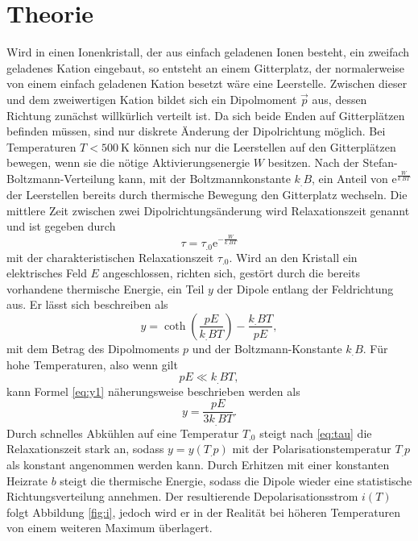 \section{Theorie}
\label{sec:Theorie}

Wird in einen Ionenkristall, der aus einfach geladenen Ionen besteht, ein zweifach geladenes Kation eingebaut, so entsteht an einem Gitterplatz, der normalerweise von einem einfach geladenen Kation besetzt wäre eine Leerstelle.
Zwischen dieser und dem zweiwertigen Kation bildet sich ein Dipolmoment $\vec{p}$ aus, dessen Richtung zunächst willkürlich verteilt ist. Da sich beide Enden auf Gitterplätzen befinden müssen, sind nur diskrete Änderung der Dipolrichtung möglich. Bei Temperaturen $T<\SI{500}{\kelvin}$ können sich nur die Leerstellen auf den Gitterplätzen bewegen, wenn sie die nötige Aktivierungsenergie $W$ besitzen. Nach der Stefan-Boltzmann-Verteilung kann, mit der Boltzmannkonstante $k_.B$, ein Anteil von $\mathrm{e}^{\frac{W}{k_.BT}}$ der Leerstellen bereits durch thermische Bewegung den Gitterplatz wechseln.
Die mittlere Zeit zwischen zwei Dipolrichtungsänderung wird Relaxationszeit genannt und ist gegeben durch
\begin{equation}
\tau=\tau_.0\mathrm{e}^{-\frac{W}{k_.BT}}\label{eq:tau}
\end{equation}
mit der charakteristischen Relaxationszeit $\tau_.0$.
Wird an den Kristall ein elektrisches Feld $E$ angeschlossen, richten sich, gestört durch die bereits vorhandene thermische Energie, ein Teil $y$ der Dipole entlang der Feldrichtung aus. Er lässt sich beschreiben als
\begin{equation}
y=\coth(\frac{p E}{k_.B T})-\frac{k_.BT}{pE}\label{eq:y1},
\end{equation}
mit dem Betrag des Dipolmoments $p$ und der Boltzmann-Konstante $k_.B$. 
Für hohe Temperaturen, also wenn gilt
\[
pE\ll k_.BT,
\]
kann Formel \eqref{eq:y1} näherungsweise beschrieben werden als
\begin{equation}
y=\frac{pE}{3k_.BT}\text{.}\label{eq:y}
\end{equation}
Durch schnelles Abkühlen auf eine Temperatur $T_.0$ steigt nach \eqref{eq:tau} die Relaxationszeit stark an, sodass $y=y(T_.p)$ mit der Polarisationstemperatur $T_.p$ als konstant angenommen werden kann.
Durch Erhitzen mit einer konstanten Heizrate $b$ steigt die thermische Energie, sodass die Dipole wieder eine statistische Richtungsverteilung annehmen. Der resultierende Depolarisationsstrom $i(T)$ folgt Abbildung \ref{fig:i}, jedoch wird er in der Realität bei höheren Temperaturen von einem weiteren Maximum überlagert.
